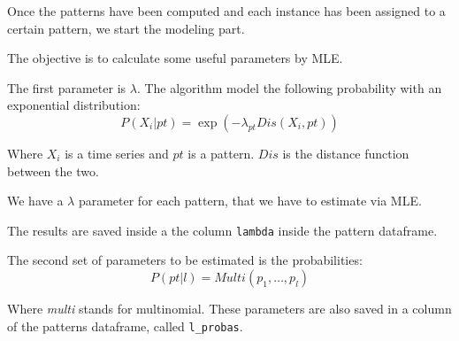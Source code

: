 Once the patterns have been computed and each instance has been assigned to 
a certain pattern, we start the modeling part.

The objective is to calculate some useful parameters by MLE.

The first parameter is $\lambda$. The algorithm model the 
following probability with an exponential distribution:
\begin{equation}
    P(X_i | pt) = \exp(-\lambda_{pt} Dis(X_i, pt))
\end{equation}

Where $X_i$ is a time series and $pt$ is a pattern. $Dis$ is the distance 
function between the two.

We have a $\lambda$ parameter for each pattern, that we have to estimate via MLE.

The results are saved inside a the column \texttt{lambda} inside the pattern
dataframe. 

The second set of parameters to be estimated is the probabilities:
\begin{equation}
    P(pt | l) = Multi(p_1, \dots, p_l)
\end{equation}

Where \textit{multi} stands for multinomial. These parameters are also saved in a 
column of the patterns dataframe, called \texttt{l\_probas}.



